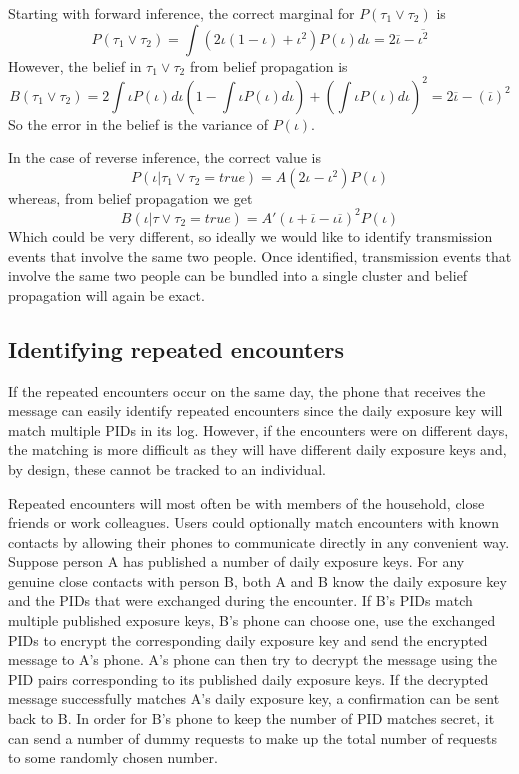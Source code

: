 \documentclass{article}
\begin{document}
Starting with forward inference, the correct marginal for $P(\tau_1 \vee \tau_2)$ is
\[
P(\tau_1 \vee \tau_2) = \int \left(2\iota(1-\iota) + \iota^2\right) P(\iota) d\iota = 2\overline{\iota} -  \overline{\iota^2} 
\]
However, the belief in $\tau_1 \vee \tau_2$ from belief propagation is
\[
B(\tau_1 \vee \tau_2) = 2\int \iota P(\iota)d\iota\left(1-\int \iota P(\iota)d\iota\right) + \left(\int \iota P(\iota)d\iota\right)^2 = 2\overline{\iota} - \left(\overline{\iota}\right)^2
\]
So the error in the belief is the variance of $P(\iota)$.

In the case of reverse inference, the correct value is
\[
P(\iota | \tau_1 \vee \tau_2 = true) = A\left(2\iota - \iota^2\right)P(\iota)
\]
whereas, from belief propagation we get
\[
B(\iota | \tau \vee \tau_2 = true) = A' (\iota + \overline{\iota}-\iota\overline{\iota})^2P(\iota)
\]
Which could be very different, so ideally we would like to identify transmission events that involve the same two people. Once identified, transmission events that involve the same two people can be bundled into a single cluster and belief propagation will again be exact.

\subsection{Identifying repeated encounters}

If the repeated encounters occur on the same day, the phone that receives the message can easily identify repeated encounters since the daily exposure key will match multiple PIDs in its log. However, if the encounters were on different days, the matching is more difficult as they will have different daily exposure keys and, by design, these cannot be tracked to an individual.

Repeated encounters will most often be with members of the household, close friends or work colleagues. Users could optionally match encounters with known contacts by allowing their phones to communicate directly in any convenient way. Suppose person A has published a number of daily exposure keys. For any genuine close contacts with person B, both A and B know the daily exposure key and the PIDs that were exchanged during the encounter. If B's PIDs match multiple published exposure keys, B's phone can choose one, use the exchanged PIDs to encrypt the corresponding daily exposure key and send the encrypted message to A's phone. A's phone can then try to decrypt the message using the PID pairs corresponding to its published daily exposure keys. If the decrypted message successfully matches A's daily exposure key, a confirmation can be sent back to B. In order for B's phone to keep the number of PID matches secret, it can send a number of dummy requests to make up the total number of requests to some randomly chosen number.
\end{document}
